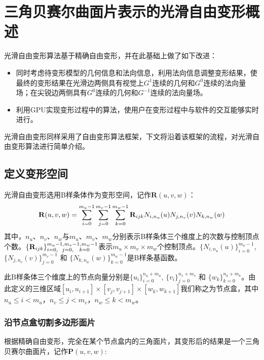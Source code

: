
\chapter{三角贝赛尔曲面片表示的光滑自由变形概述}
光滑自由变形算法基于精确自由变形\cite{Feng98}，并在此基础上做了如下改进：

\begin{itemize}
    \item 同时考虑待变形模型的几何信息和法向信息，利用法向信息调整变形结果，使最终的变形结果在光滑边两侧具有视觉上$G^1$连续的几何和$G^0$连续的法向量场；在尖锐边两侧具有$G^0$连续的几何和$G^{-1}$连续的法向量场。
        \item 利用GPU实现变形过程中的算法，使用户在变形过程中与软件的交互能够实时进行。
\end{itemize}

光滑自由变形同样采用了自由变形算法框架，下文将沿着该框架的流程，对光滑自由变形算法进行简单介绍。

\section{定义变形空间}
光滑自由变形选用B样条体作为变形空间，记作$\mathbf R(u,v,w)$：
\begin{equation}
	\footnotesize
	{\mathbf R}(u,v,w) 
	= \sum_{i=0}^{m_u-1}\sum_{j=0}^{m_v-1}\sum_{k=0}^{m_w-1} {\mathbf R}_{ijk}N_{i,n_u}(u)N_{j,n_v}(v)N_{k,n_w}(w)
	\label{equ:Ruvw}
\end{equation}
其中，$n_u$、$n_v$、$n_w$与$m_u$、$m_v$、$m_w$分别表示B样条体三个维度上的次数与控制顶点个数。$\{\mathbf R_{ijk}\}_{i=0,\hspace{6 pt} j=0,\hspace{8 pt} k=0}^{m_u-1,m_v-1,m_w-1}$表示$m_u\times m_v\times m_w$个控制顶点。$\{N_{i,n_u}(u)\}_{i=0}^{m_u-1}$, $\{N_{j,n_v}(v)\}_{j=0}^{m_v-1}$ 和 $\{N_{k,n_w}(w)\}_{k=0}^{m_w-1}$是B样条基函数。

此B样条体三个维度上的节点向量分别是$\{u_i\}^{n_u+m_u}_{i=0}$, $\{v_i\}^{n_v+m_v}_{j=0}$ 和 $\{w_k\}^{n_k+m_k}_{k=0}$。由此定义的三维区域$[u_i, u_{i+1}] \times [v_j, v_{j+1}] \times [w_k, w_{k+1}]$我们称之为节点盒，其中$n_u\leq i < m_u$，$n_v\leq j < m_v$，$n_w\leq k < m_w$。


\subsection{沿节点盒切割多边形面片} \label{sec:clip_against_knot_box}
根据精确自由变形\cite{Feng98, Feng00}，完全在某个节点盒内的三角面片，其变形后的结果是一个三角贝赛尔曲面片，记作${\mathbf P}(u,v,w)$:\label{section:split}

